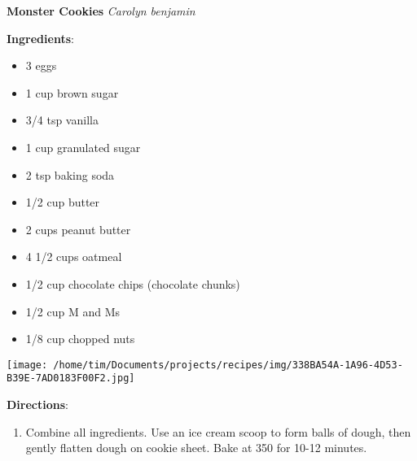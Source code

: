 \documentclass[11pt, twoside, openany]{book}
\begin{document}
\noindent\begin{minipage}[t]{\linewidth}%
{\Large\textbf{Monster Cookies}} \label{monster-cookies}\hfill\textit{Carolyn benjamin}\\
\noindent\begin{minipage}[t]{0.78\linewidth}%
\textbf{Ingredients}:\vspace{-3mm}
\begin{multicols}{2}
\begin{itemize}\setlength\itemsep{-1mm}
\item 3 eggs
\item 1 cup brown sugar
\item 3/4 tsp vanilla
\item 1 cup granulated sugar
\item 2 tsp baking soda
\item 1/2 cup butter
\item 2 cups peanut butter
\item 4 1/2 cups oatmeal
\item 1/2 cup chocolate chips (chocolate chunks)
\item 1/2 cup M and Ms
\item 1/8 cup chopped nuts
\end{itemize}
\end{multicols}
\end{minipage}
\noindent\begin{minipage}[t]{0.18\linewidth}
\centering \strut\vspace*{-\baselineskip}\newline
\texttt{[image: /home/tim/Documents/projects/recipes/img/338BA54A-1A96-4D53-B39E-7AD0183F00F2.jpg]}\\
\end{minipage}\vspace{3mm}
\textbf{Directions}:
\vspace{-3mm}\begin{enumerate}\setlength\itemsep{-1mm}
\item Combine all ingredients. Use an ice cream scoop to form balls of dough, then gently flatten dough on cookie sheet. Bake at 350 for 10-12 minutes.
\end{enumerate}
\end{minipage}\vspace{8mm}
\end{document}
